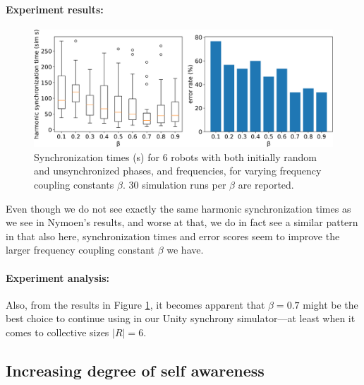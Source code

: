 		\paragraph{Experiment results:\nl}
		
		\begin{figure}[ht!]
			\centering
			\includegraphics[width=\linewidth]{Assets/DocSegments/Chapters/ExperimentsAndResults/Figures/PerfScores/baseline_reproducing_phase_and_freq_sync_for_beta.pdf}
			\caption[Experiment results for second $\phi$ \& $\omega$ synchronization baseline reproduction experiment.]{Synchronization times (s) for 6 robots with both initially random and unsynchronized phases, and frequencies, for varying frequency coupling constants $\beta$. 30 simulation runs per $\beta$ are reported.}
			\label{fig:baseline_reproducing_phase_and_freq_sync_for_beta}
		\end{figure}
		
		Even though we do not see exactly the same harmonic synchronization times as we see in Nymoen's results, and worse at that, we do in fact see a similar pattern in that also here, synchronization times and error scores seem to improve the larger frequency coupling constant $\beta$ we have.
		
		\paragraph{Experiment analysis:\nl}
		
		Also, from the results in Figure \ref{fig:baseline_reproducing_phase_and_freq_sync_for_beta}, it becomes apparent that $\beta=0.7$ might be the best choice to continue using in our Unity synchrony simulator—at least when it comes to collective sizes $|R|=6$.
		
	
	\subsection{Increasing degree of self awareness}
	\label{exp:phase_and_freq_sync:increasing_SA_deg}
	
